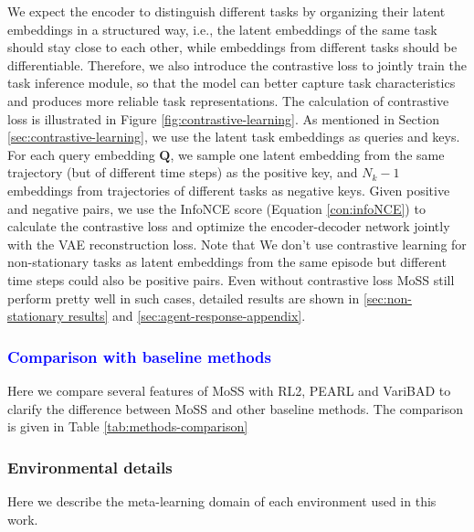 \documentclass[letterpaper]{article} %
\begin{document}
We expect the encoder to distinguish different tasks by organizing their latent embeddings in a structured way, i.e., the latent embeddings of the same task should stay close to each other, while embeddings from different tasks should be differentiable. Therefore, we also introduce the contrastive loss to jointly train the task inference module, so that the model can better capture task characteristics and produces more reliable task representations. The calculation of contrastive loss is illustrated in Figure \ref{fig:contrastive-learning}. As mentioned in Section \ref{sec:contrastive-learning}, we use the latent task embeddings as queries and keys. For each query embedding $\bm Q$, we sample one latent embedding from the same trajectory (but of different time steps) as the positive key, and $N_k - 1$ embeddings from trajectories of different tasks as negative keys. Given positive and negative pairs, we use the InfoNCE score \cite{InfoNCE} (Equation \ref{con:infoNCE}) to calculate the contrastive loss and optimize the encoder-decoder network jointly with the VAE reconstruction loss. Note that We don’t use contrastive learning for non-stationary tasks as latent embeddings from the same episode but different time steps could also be positive pairs. Even without contrastive loss MoSS still perform pretty well in such cases, detailed results are shown in \ref{sec:non-stationary results} and \ref{sec:agent-response-appendix}.

\textcolor{blue}{\subsubsection{Comparison with baseline methods}}
Here we compare several features of MoSS with RL2, PEARL and VariBAD to clarify the difference between MoSS and other baseline methods. The comparison is given in Table \ref{tab:methods-comparison}


\subsubsection{Environmental details}
\label{sec:environmental-details}

Here we describe the meta-learning domain of each environment used in this work.\par
\end{document}
